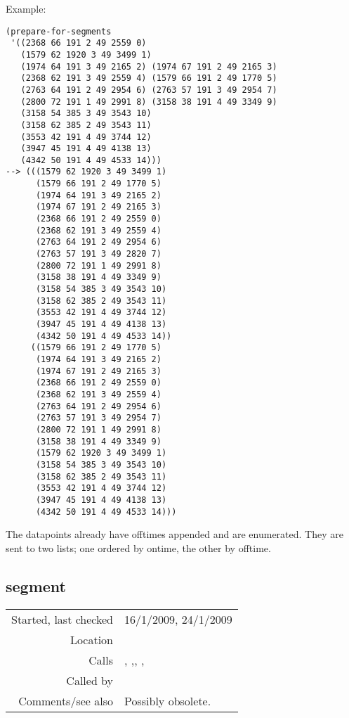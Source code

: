\vspace{0.5cm}
\noindent Example:
\begin{verbatim}
(prepare-for-segments
 '((2368 66 191 2 49 2559 0)
   (1579 62 1920 3 49 3499 1)
   (1974 64 191 3 49 2165 2) (1974 67 191 2 49 2165 3)
   (2368 62 191 3 49 2559 4) (1579 66 191 2 49 1770 5)
   (2763 64 191 2 49 2954 6) (2763 57 191 3 49 2954 7)
   (2800 72 191 1 49 2991 8) (3158 38 191 4 49 3349 9)
   (3158 54 385 3 49 3543 10)
   (3158 62 385 2 49 3543 11)
   (3553 42 191 4 49 3744 12)
   (3947 45 191 4 49 4138 13)
   (4342 50 191 4 49 4533 14)))
--> (((1579 62 1920 3 49 3499 1)
      (1579 66 191 2 49 1770 5)
      (1974 64 191 3 49 2165 2)
      (1974 67 191 2 49 2165 3)
      (2368 66 191 2 49 2559 0)
      (2368 62 191 3 49 2559 4)
      (2763 64 191 2 49 2954 6)
      (2763 57 191 3 49 2820 7)
      (2800 72 191 1 49 2991 8)
      (3158 38 191 4 49 3349 9)
      (3158 54 385 3 49 3543 10)
      (3158 62 385 2 49 3543 11)
      (3553 42 191 4 49 3744 12)
      (3947 45 191 4 49 4138 13)
      (4342 50 191 4 49 4533 14))
     ((1579 66 191 2 49 1770 5)
      (1974 64 191 3 49 2165 2)
      (1974 67 191 2 49 2165 3)
      (2368 66 191 2 49 2559 0)
      (2368 62 191 3 49 2559 4)
      (2763 64 191 2 49 2954 6)
      (2763 57 191 3 49 2954 7)
      (2800 72 191 1 49 2991 8)
      (3158 38 191 4 49 3349 9)
      (1579 62 1920 3 49 3499 1)
      (3158 54 385 3 49 3543 10)
      (3158 62 385 2 49 3543 11)
      (3553 42 191 4 49 3744 12)
      (3947 45 191 4 49 4138 13)
      (4342 50 191 4 49 4533 14)))
\end{verbatim}

\noindent The datapoints already have offtimes
appended and are enumerated. They are sent to two
lists; one ordered by ontime, the other by offtime.


\subsection*{segment}\label{fun:segment}

\vspace{0.3cm}
\begin{tabular}{r|p{8cm}}
Started, last checked & 16/1/2009, 24/1/2009 \\
Location & \nameref{sec:segmentation} \\
Calls & \nameref{fun:add-to-list}, \nameref{fun:chord-candidates-offtimes},\newline \nameref{fun:chord-candidates-ontimes}, \nameref{fun:first-n-naturals},\newline \nameref{fun:nth-list} \\
Called by & \nameref{fun:segments} \\
Comments/see also & Possibly obsolete.
\end{tabular}

